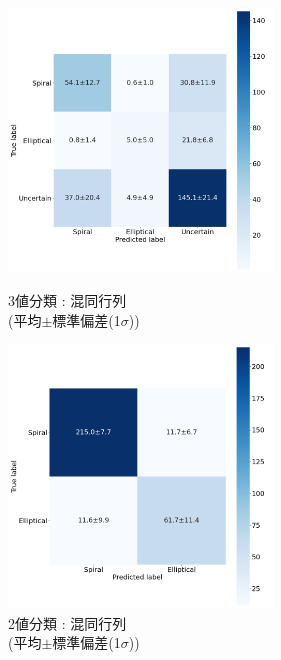 \documentclass[a4j, 11pt]{jreport}
\begin{document}
\begin{figure}[H]
  \begin{minipage}[b]{0.45\hsize}
    \centering
    \includegraphics[keepaspectratio, width=7cm]{images/cm_mean_std_ex4-1.png}
    \caption{3値分類 : 混同行列\\(平均$\pm$標準偏差(1$\sigma$))}
		\label{fig:cm_ex4-1}
  \end{minipage}
  \begin{minipage}[b]{0.45\hsize}
    \centering
    \includegraphics[keepaspectratio, width=7cm]{images/cm_mean_std_ex4-2.png}
    \caption{2値分類 : 混同行列\\(平均$\pm$標準偏差(1$\sigma$))}
		\label{fig:cm_ex4-2}
  \end{minipage}
\end{figure}


\end{document}
